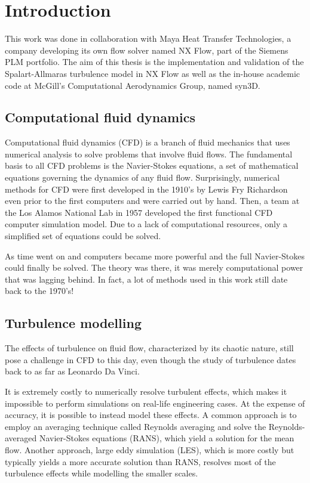 \chapter{Introduction}
This work was done in collaboration with Maya Heat Transfer Technologies, a company developing its own flow solver named NX Flow, part of the Siemens PLM portfolio. The aim of this thesis is the implementation and validation of the Spalart-Allmaras turbulence model in NX Flow as well as the in-house academic code at McGill's Computational Aerodynamics Group, named syn3D.


\section{Computational fluid dynamics}
Computational fluid dynamics (CFD) is a branch of fluid mechanics that uses numerical analysis to solve problems that involve fluid flows. The fundamental basis to all CFD problems is the Navier-Stokes equations, a set of mathematical equations governing the dynamics of any fluid flow. Surprisingly, numerical methods for CFD were first developed in the 1910's by Lewis Fry Richardson even prior to the first computers and were carried out by hand. Then, a team at the Los Alamos National Lab in 1957 developed the first functional CFD computer simulation model. Due to a lack of computational resources, only a simplified set of equations could be solved.

As time went on and computers became more powerful and the full Navier-Stokes could finally be solved. The theory was there, it was merely computational power that was lagging behind. In fact, a lot of methods used in this work still date back to the 1970's!
\section{Turbulence modelling}
The effects of turbulence on fluid flow, characterized by its chaotic nature, still pose a challenge in CFD to this day, even though the study of turbulence dates back to as far as Leonardo Da Vinci.

It is extremely costly to numerically resolve turbulent effects, which makes it impossible to perform simulations on real-life engineering cases. At the expense of accuracy, it is possible to instead model these effects. A common approach is to employ an averaging technique called Reynolds averaging and solve the Reynolds-averaged Navier-Stokes equations (RANS), which yield a solution for the mean flow. Another approach, large eddy simulation (LES), which is more costly but typically yields a more accurate solution than RANS, resolves most of the turbulence effects while modelling the smaller scales.

